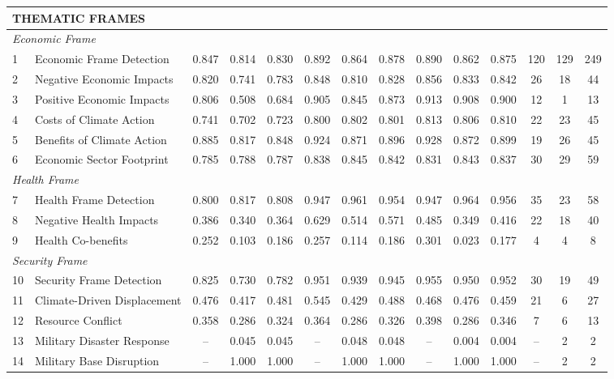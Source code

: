 \documentclass[12pt]{article}
\begin{document}
{\begin{longtable}{p{0.4cm}p{5.5cm}cccccccccccc}
\multicolumn{14}{l}{\cellcolor{gray!10}\textbf{THEMATIC FRAMES}} \\
\midrule
\multicolumn{14}{l}{\textit{Economic Frame}} \\
1 & Economic Frame Detection & 0.847 & 0.814 & 0.830 & 0.892 & 0.864 & 0.878 & 0.890 & 0.862 & 0.875 & 120 & 129 & 249 \\
2 & Negative Economic Impacts & 0.820 & 0.741 & 0.783 & 0.848 & 0.810 & 0.828 & 0.856 & 0.833 & 0.842 & 26 & 18 & 44 \\
3 & Positive Economic Impacts & 0.806 & 0.508 & 0.684 & 0.905 & 0.845 & 0.873 & 0.913 & 0.908 & 0.900 & 12 & 1 & 13 \\
4 & Costs of Climate Action & 0.741 & 0.702 & 0.723 & 0.800 & 0.802 & 0.801 & 0.813 & 0.806 & 0.810 & 22 & 23 & 45 \\
5 & Benefits of Climate Action & 0.885 & 0.817 & 0.848 & 0.924 & 0.871 & 0.896 & 0.928 & 0.872 & 0.899 & 19 & 26 & 45 \\
6 & Economic Sector Footprint & 0.785 & 0.788 & 0.787 & 0.838 & 0.845 & 0.842 & 0.831 & 0.843 & 0.837 & 30 & 29 & 59 \\
\midrule
\multicolumn{14}{l}{\textit{Health Frame}} \\
7 & Health Frame Detection & 0.800 & 0.817 & 0.808 & 0.947 & 0.961 & 0.954 & 0.947 & 0.964 & 0.956 & 35 & 23 & 58 \\
8 & Negative Health Impacts & 0.386 & 0.340 & 0.364 & 0.629 & 0.514 & 0.571 & 0.485 & 0.349 & 0.416 & 22 & 18 & 40 \\
9 & Health Co-benefits & 0.252 & 0.103 & 0.186 & 0.257 & 0.114 & 0.186 & 0.301 & 0.023 & 0.177 & 4 & 4 & 8 \\
\midrule
\multicolumn{14}{l}{\textit{Security Frame}} \\
10 & Security Frame Detection & 0.825 & 0.730 & 0.782 & 0.951 & 0.939 & 0.945 & 0.955 & 0.950 & 0.952 & 30 & 19 & 49 \\
11 & Climate-Driven Displacement & 0.476 & 0.417 & 0.481 & 0.545 & 0.429 & 0.488 & 0.468 & 0.476 & 0.459 & 21 & 6 & 27 \\
12 & Resource Conflict & 0.358 & 0.286 & 0.324 & 0.364 & 0.286 & 0.326 & 0.398 & 0.286 & 0.346 & 7 & 6 & 13 \\
13 & Military Disaster Response & -- & 0.045 & 0.045 & -- & 0.048 & 0.048 & -- & 0.004 & 0.004 & -- & 2 & 2 \\
14 & Military Base Disruption & -- & 1.000 & 1.000 & -- & 1.000 & 1.000 & -- & 1.000 & 1.000 & -- & 2 & 2 \\
\midrule

\end{longtable}}
\end{document}
